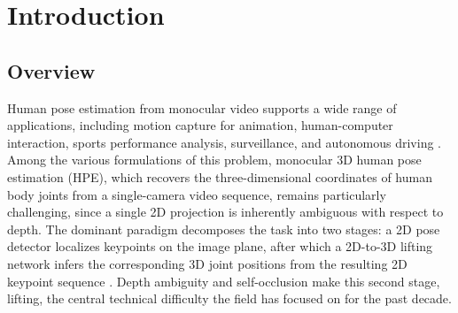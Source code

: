 \setlength{\footskip}{8mm}

\chapter{Introduction}
\label{ch:introduction}

\section{Overview}
\label{sec:intro-overview}

Human pose estimation from monocular video supports a wide range of
applications, including motion capture for animation, human-computer
interaction, sports performance analysis, surveillance, and autonomous
driving \cite{guo2025survey3dhpe}. Among the various formulations of this
problem, monocular 3D human pose estimation (HPE), which recovers the
three-dimensional coordinates of human body joints from a single-camera
video sequence, remains particularly challenging, since a single 2D
projection is inherently ambiguous with respect to depth. The dominant
paradigm decomposes the task into two stages: a 2D pose detector localizes
keypoints on the image plane, after which a 2D-to-3D lifting network infers
the corresponding 3D joint positions from the resulting 2D keypoint
sequence \cite{pavllo2019videopose3d}. Depth ambiguity and self-occlusion
make this second stage, lifting, the central technical difficulty the
field has focused on for the past decade.

